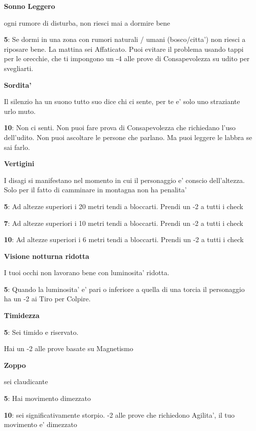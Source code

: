 \documentclass[a4paper,11pt,twoside,openany]{book}
\begin{document}
{\textbf{Sonno Leggero}

ogni rumore di disturba, non riesci mai a dormire bene

\textbf{5}: Se dormi in una zona con rumori naturali / umani (bosco/citta') non riesci a riposare bene. La mattina sei Affaticato. Puoi evitare il problema usando tappi per le orecchie, che ti impongono un -4 alle prove di Consapevolezza su udito per svegliarti.

\textbf{Sordita'}

Il silenzio ha un suono tutto suo dice chi ci sente, per te e' solo uno straziante urlo muto.

\textbf{10}: Non ci senti. Non puoi fare prova di Consapevolezza che richiedano l'uso dell'udito. Non puoi ascoltare le persone che parlano. Ma puoi leggere le labbra se sai farlo.

\textbf{Vertigini}

I disagi si manifestano nel momento in cui il personaggio e' conscio dell'altezza. Solo per il fatto di camminare in montagna non ha penalita'

\textbf{5}: Ad altezze superiori i 20 metri tendi a bloccarti. Prendi un -2 a tutti i check

\textbf{7}: Ad altezze superiori i 10 metri tendi a bloccarti. Prendi un -2 a tutti i check

\textbf{10}: Ad altezze superiori i 6 metri tendi a bloccarti. Prendi un -2 a tutti i check

\textbf{Visione notturna ridotta}

I tuoi occhi non lavorano bene con luminosita' ridotta.

\textbf{5}: Quando la luminosita' e' pari o inferiore a quella di una torcia il personaggio ha un -2 ai Tiro per Colpire.

\textbf{Timidezza}

\textbf{5}: Sei timido e riservato.

Hai un -2 alle prove basate su Magnetismo

\textbf{Zoppo}

sei claudicante

\textbf{5}: Hai movimento dimezzato

\textbf{10}: sei significativamente storpio. -2 alle prove che richiedono Agilita', il tuo movimento e' dimezzato

\bigskip

}
\end{document}

